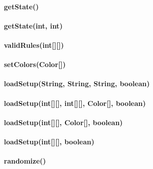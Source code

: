 \paragraph{getState()}
\paragraph{getState(int, int)}
\paragraph{validRules(int[][])}
\paragraph{setColors(Color[])}
\paragraph{loadSetup(String, String, String, boolean)}
\paragraph{loadSetup(int[][], int[][], Color[], boolean)}
\paragraph{loadSetup(int[][], Color[], boolean)}
\paragraph{loadSetup(int[][], boolean)}
\paragraph{randomize()}